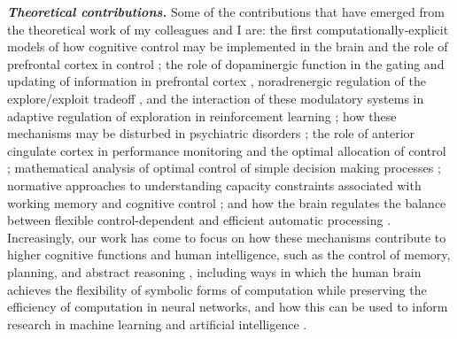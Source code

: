 \documentclass[10 pt]{article}
\begin{document}
\textit{\textbf{Theoretical contributions.}} Some of the contributions that have emerged from the theoretical work of my colleagues and I are: the first computationally-explicit models of how cognitive control may be implemented in the brain \cite{cohen1990control} and the role of prefrontal cortex in control \cite{miller2001integrative}; the role of dopaminergic function in the gating and updating of information in prefrontal cortex \cite{servan-schreiber1990network}\cite{nystrom2000working}, noradrenergic regulation of the explore/exploit tradeoff \cite{usher1999role}\cite{aston-jones2005integrative}\cite{cohen2007stayorgo}, and the interaction of these modulatory systems in adaptive regulation of exploration in reinforcement learning \cite{mcclure2005exploration}; how these mechanisms may be disturbed in psychiatric disorders \cite{cohen1992context}\cite{cohen1999context}\cite{macdonald2005specificity}; the role of anterior cingulate cortex in performance monitoring \cite{botvinick2001conflict}\cite{yeung2004neural}\cite{shenhav2014anterior} and the optimal allocation of control \cite{shenhav2013expected}\cite{shenhav2017toward}; mathematical analysis of optimal control of simple decision making processes \cite{bogacz2006physics}\cite{simen2009reward}; normative approaches to understanding capacity constraints associated with working memory \cite{usher2001neural}\cite{todd2008learning} and cognitive control \cite{feng2014multitasking}\cite{musslick2021rationalizing}\cite{rand2017cyclical}; and how the brain regulates the balance between flexible control-dependent and efficient automatic processing \cite{sagiv2018efficiency}. Increasingly, our work has come to focus on how these mechanisms contribute to higher cognitive functions and human intelligence, such as the control of memory, planning, and abstract reasoning \cite{frankland2019extracting}\cite{agrawal2021temporal}\cite{beukers2021activity}\cite{ho2022people}, including ways in which the human brain achieves the flexibility of symbolic forms of computation \cite{rougier2005prefrontal}\cite{kriete2013indirection}\cite{webb2021emergent}\cite{segert2022maximum} while preserving the efficiency of computation in neural networks, and how this can be used to inform research in machine learning and artificial intelligence \cite{kumar2022using}\cite{gleeson2023integrating}\cite{altabaa2024abstractors}.
\end{document}
